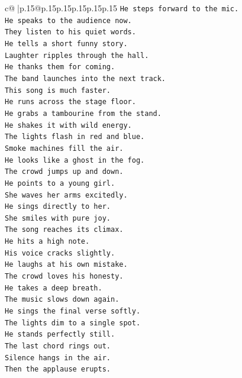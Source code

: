 \documentclass{article}
\begin{document}
{\begin{supertabular}{c@{$\;$}|p{.15\linewidth}@{}p{.15\linewidth}p{.15\linewidth}p{.15\linewidth}p{.15\linewidth}p{.15\linewidth}}
{{{\texttt{He steps forward to the mic.} \\
\texttt{He speaks to the audience now.} \\
\texttt{They listen to his quiet words.} \\
\texttt{He tells a short funny story.} \\
\texttt{Laughter ripples through the hall.} \\
\texttt{He thanks them for coming.} \\
\texttt{The band launches into the next track.} \\
\texttt{This song is much faster.} \\
\texttt{He runs across the stage floor.} \\
\texttt{He grabs a tambourine from the stand.} \\
\texttt{He shakes it with wild energy.} \\
\texttt{The lights flash in red and blue.} \\
\texttt{Smoke machines fill the air.} \\
\texttt{He looks like a ghost in the fog.} \\
\texttt{The crowd jumps up and down.} \\
\texttt{He points to a young girl.} \\
\texttt{She waves her arms excitedly.} \\
\texttt{He sings directly to her.} \\
\texttt{She smiles with pure joy.} \\
\texttt{The song reaches its climax.} \\
\texttt{He hits a high note.} \\
\texttt{His voice cracks slightly.} \\
\texttt{He laughs at his own mistake.} \\
\texttt{The crowd loves his honesty.} \\
\texttt{He takes a deep breath.} \\
\texttt{The music slows down again.} \\
\texttt{He sings the final verse softly.} \\
\texttt{The lights dim to a single spot.} \\
\texttt{He stands perfectly still.} \\
\texttt{The last chord rings out.} \\
\texttt{Silence hangs in the air.} \\
\texttt{Then the applause erupts.} \\
}}}
\end{supertabular}}
\end{document}
